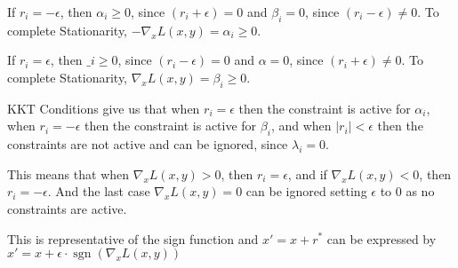 \documentclass{article}
\DeclareMathOperator{\sgn}{sgn}
\begin{document}
If $r_{i} = -\epsilon$, then $\alpha_{i} \ge 0$, since $ (r_{i} + \epsilon) = 0 $ and $\beta_{i} = 0$, since $ (r_{i} - \epsilon) \ne 0$. To complete Stationarity, 
$-\nabla_{x} L(x,y) = \alpha_{i} \ge 0$.

If $r_{i} = \epsilon$, then $\_{i} \ge 0$, since $ (r_{i} - \epsilon) = 0 $ and $\alpha = 0$, since $ (r_{i} + \epsilon) \ne 0$. To complete Stationarity, 
$\nabla_{x} L(x,y) = \beta_{i} \ge 0$.

KKT Conditions give us that when $r_{i} = \epsilon$ then the constraint is active for $\alpha_{i}$, 
when $r_{i} = -\epsilon$ then the constraint is active for $\beta_{i}$, 
and when $|r_{i}| < \epsilon$ then the constraints are not active and can be ignored, since $\lambda_{i} = 0$.

This means that when $\nabla_{x} L(x,y) > 0$, then $r_{i} = \epsilon$,
and if  $\nabla_{x} L(x,y) < 0$, then $r_{i} = -\epsilon$.
And the last case $\nabla_{x} L(x,y) = 0$ can be ignored setting $\epsilon$ to 0 as no constraints are active.

This is representative of the sign function and $x\prime = x + r^\ast$ 
can be expressed by $x\prime = x + \epsilon \cdot \sgn(\nabla_{x}L(x,y))$
\end{document}
